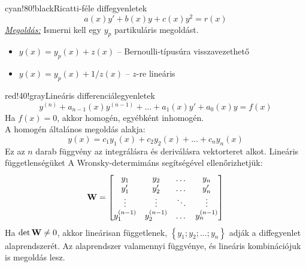 \documentclass[main.tex]{subfiles}
\begin{document}
\begin{cbox}{cyan!80!black}{Ricatti-féle diffegyenletek}
  \[
    a(x) y' + b(x) y + c(x) y^2 = r(x)
  \]
  \emph{\underline{Megoldás:}}
  \quad Ismerni kell egy $y_p$ partikuláris megoldást.
  \begin{itemize}
    \item $y(x) = y_p(x) + z(x)$
          \tabto{4.4cm} – \tabto{5cm}
          Bernoulli-típusúra visszavezethető

    \item $y(x) = y_p(x) + 1/z(x)$
          \tabto{4.4cm} – \tabto{5cm}
          $z$-re lineáris
  \end{itemize}
\end{cbox}



\begin{cbox}{red!40!gray}{Lineáris differenciálegyenletek}
  \[
    y^{(n)}
    + a_{n-1}(x) y^{(n-1)}
    + \dots
    + a_1(x) y'
    + a_0(x) y
    = f(x)
  \]
  Ha $f(x) = 0$, akkor homogén, egyébként inhomogén.
  \\[2mm]
  A homogén általános megoldás alakja:
  \[
    y(x)
    = c_1 y_1(x)
    + c_2 y_2(x)
    + \dots
    + c_n y_n(x)
  \]
  Ez az $n$ darab függvény az integrálásra és
  deriválásra vektorteret alkot. Lineáris függetlenségüket
  A Wronsky-determimáns segítségével ellenőrizhetjük:
  \[
    \mathbf{W} = \begin{bmatrix}
      y_1         & y_2         & \dots  & y_n         \\
      y_1'        & y_2'        & \dots  & y_n'        \\
      \vdots      & \vdots      & \ddots & \vdots      \\
      y_1^{(n-1)} & y_2^{(n-1)} & \dots  & y_n^{(n-1)} \\
    \end{bmatrix}
  \]
  Ha $\det \mathbf{W} \neq 0$, akkor lineárisan függetlenek,
  $\left\{ y_1; y_2; \dots; y_n \right\}$ adják a diffegyenlet
  alaprendszerét. Az alaprendszer valamennyi függvénye, és
  lineáris kombinációjuk is megoldás lesz.
\end{cbox}
\end{document}
